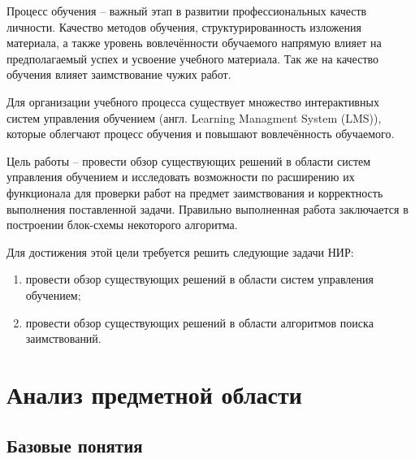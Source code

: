 



	



\normalsize

\setcounter{page}{2}

\tableofcontents
\normalsize

\pagebreak


Процесс обучения -- важный этап в развитии профессиональных качеств личности. Качество методов обучения, структурированность изложения материала, а также уровень вовлечённости обучаемого напрямую влияет на предполагаемый успех и усвоение учебного материала\cite{effective-learning}. Так же на качество обучения влияет заимствование чужих работ\cite{plagiat}.

Для организации учебного процесса существует множество интерактивных систем управления обучением (англ. Learning Managment System (LMS\cite{lms})), которые облегчают процесс обучения и повышают вовлечённость обучаемого.

Цель работы -- провести обзор существующих решений в области систем управления обучением и исследовать возможности по расширению их функционала для проверки работ на предмет заимствования и корректность выполнения поставленной задачи. Правильно выполненная работа заключается в построении блок-схемы некоторого алгоритма.

Для достижения этой цели требуется решить следующие задачи НИР:
\begin{enumerate}
	\item провести обзор существующих решений в области систем управления обучением;
	\item провести обзор существующих решений в области алгоритмов поиска заимствований.
\end{enumerate}

\clearpage

\section{Анализ предметной области}
\subsection{Базовые понятия}

